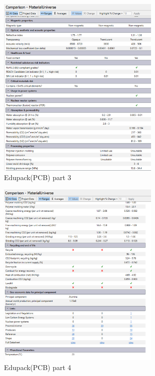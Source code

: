         \begin{figure}[htbp]
            \centering
            \includegraphics[width=0.7\textwidth]{figures/Appendix-Mats/Fig3PCB.png}
            \caption*{Edupack(PCB) part 3} 
            \label{fig:PCB2}
            \end{figure}

            \begin{figure}[htbp]
                \centering
                \includegraphics[width=0.7\textwidth]{figures/Appendix-Mats/Fig4PCB.png}
                \caption*{Edupack(PCB) part 4} 
                \label{fig:PCB3}
                \end{figure}

